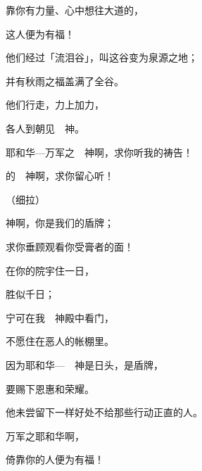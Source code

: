 {\BB \par }{\Q {}靠你有力量、心中想往{}大道的，
\par }{\Q 这人便为有福！
\par }{\Q {}他们经过「流泪谷」，叫这谷变为泉源之地；
\par }{\Q 并有秋雨之福盖满了全谷。
\par }{\Q {}他们行走，力上加力，
\par }{\Q 各人到{}朝见　神。
\par }{\BB \par }{\Q {}耶和华—万军之　神啊，求你听我的祷告！
\par }{的　神啊，求你留心听！
\par }{\QS （细拉）
\par }
{\Q {}神啊，你是我们的盾牌；
\par }{\Q 求你垂顾观看你受膏者的面！
\par }{\BB \par }{\Q {}在你的院宇住一日，
\par }{\Q 胜似{}千日；
\par }{\Q 宁可在我　神殿中看门，
\par }{\Q 不愿住在恶人的帐棚里。
\par }{\Q {}因为耶和华—　神是日头，是盾牌，
\par }{\Q 要赐下恩惠和荣耀。
\par }{\Q 他未尝留下一样好处不给那些行动正直的人。
\par }{\Q {}万军之耶和华啊，
\par }{\Q 倚靠你的人便为有福！

\par }
